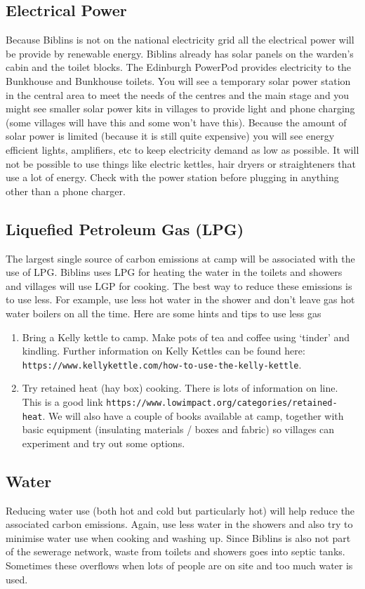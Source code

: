 \documentclass[a4paper, 11pt]{report}
\begin{document}
\subsection{Electrical Power}
Because Biblins is not on the national electricity grid all the electrical power will be provide by renewable energy. Biblins already has solar panels on the warden's cabin and the toilet blocks. The Edinburgh PowerPod provides electricity to the Bunkhouse and Bunkhouse toilets. You will see a temporary solar power station in the central area to meet the needs of the centres and the main stage and you might see smaller solar power kits in villages to provide light and phone charging (some villages will have this and some won't have this). Because the amount of solar power is limited (because it is still quite expensive) you will see energy efficient lights, amplifiers, etc to keep electricity demand as low as possible. It will not be possible to use things like electric kettles, hair dryers or straighteners that use a lot of energy. Check with the power station before plugging in anything other than a phone charger.
\subsection{Liquefied Petroleum Gas (LPG)}
The largest single source of carbon emissions at camp will be associated with the use of LPG. Biblins uses LPG for heating the water in the toilets and showers and villages will use LGP for cooking. The best way to reduce these emissions is to use less. For example, use less hot water in the shower and don't leave gas hot water boilers on all the time. Here are some hints and tips to use less gas
\begin{enumerate}
    \item Bring a Kelly kettle to camp. Make pots of tea and coffee using `tinder' and kindling. Further information on Kelly Kettles can be found here: \texttt{https://www.kellykettle.com/how-to-use-the-kelly-kettle}.
    \item Try retained heat (hay box) cooking. There is lots of information on line. This is a good link \texttt{https://www.lowimpact.org/categories/retained-heat}. We will also have a couple of books available at camp, together with basic equipment (insulating materials / boxes and fabric) so villages can experiment and try out some options.
\end{enumerate}

\subsection{Water}
Reducing water use (both hot and cold but particularly hot) will help reduce the associated carbon emissions. Again, use less water in the showers and also try to minimise water use when cooking and washing up. Since Biblins is also not part of the sewerage network, waste from toilets and showers goes into septic tanks. Sometimes these overflows when lots of people are on site and too much water is used.
\end{document}
